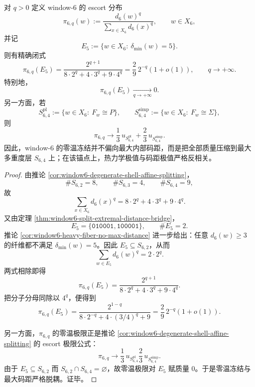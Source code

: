\begin{theorem}[零温冻结与几何极值的严格反相关]\label{thm:conclusion-window6-zero-temp-vs-codegap-anticorrelation}
对 \(q>0\) 定义 window-\(6\) 的 escort 分布
\[
\pi_{6,q}(w):=\frac{d_6(w)^q}{\sum_{x\in X_6}d_6(x)^q},
\qquad
w\in X_6,
\]
并记
\[
E_5:=\{w\in X_6:\ \delta_{\min}(w)=5\}.
\]
则有精确闭式
\[
\pi_{6,q}(E_5)
=
\frac{2^{q+1}}{8\cdot 2^q+4\cdot 3^q+9\cdot 4^q}
=
\frac{2}{9}\,2^{-q}(1+o(1)),
\qquad q\to+\infty.
\]
特别地，
\[
\pi_{6,q}(E_5)\xrightarrow[q\to+\infty]{}0.
\]
另一方面，若
\[
S_{6,4}^{\mathrm{pl}}:=\{w\in X_6:\ F_w\cong P\},
\qquad
S_{6,4}^{\mathrm{simp}}:=\{w\in X_6:\ F_w\cong \Sigma\},
\]
则
\[
\pi_{6,q}\longrightarrow
\frac13\,u_{S_{6,4}^{\mathrm{pl}}}
+\frac23\,u_{S_{6,4}^{\mathrm{simp}}}.
\]
因此，window-\(6\) 的零温冻结并不偏向最大内部码距，而是把全部质量压缩到最大多重度层 \(S_{6,4}\) 上；在该锚点上，热力学极值与码距极值严格反相关。
\end{theorem}
\begin{proof}
由推论 \ref{cor:window6-degenerate-shell-affine-splitting}，
\[
\#S_{6,2}=8,\qquad \#S_{6,3}=4,\qquad \#S_{6,4}=9,
\]
故
\[
\sum_{x\in X_6}d_6(x)^q=8\cdot 2^q+4\cdot 3^q+9\cdot 4^q.
\]
又由定理 \ref{thm:window6-split-extremal-distance-bridge}，
\[
E_5=\{\texttt{010001},\texttt{100001}\},
\qquad
\#E_5=2.
\]
推论 \ref{cor:window6-heavy-fiber-no-max-distance} 进一步给出：任意 \(d_6(w)\ge 3\) 的纤维都不满足 \(\delta_{\min}(w)=5\)。因此 \(E_5\subseteq S_{6,2}\)，从而
\[
\sum_{w\in E_5}d_6(w)^q=2\cdot 2^q.
\]
两式相除即得
\[
\pi_{6,q}(E_5)=\frac{2^{q+1}}{8\cdot 2^q+4\cdot 3^q+9\cdot 4^q}.
\]
把分子分母同除以 \(4^q\)，便得到
\[
\pi_{6,q}(E_5)
=
\frac{2^{1-q}}{8\cdot 2^{-q}+4\cdot (3/4)^q+9}
=
\frac{2}{9}\,2^{-q}(1+o(1)).
\]

另一方面，\(\pi_{6,q}\) 的零温极限正是推论 \ref{cor:window6-degenerate-shell-affine-splitting} 的 escort 极限公式：
\[
\pi_{6,q}\longrightarrow
\frac13\,u_{S_{6,4}^{\mathrm{pl}}}
\frac23\,u_{S_{6,4}^{\mathrm{simp}}}.
\]
由于 \(E_5\subseteq S_{6,2}\) 而 \(S_{6,2}\cap S_{6,4}=\varnothing\)，故零温极限对 \(E_5\) 赋质量 \(0\)。于是零温冻结与最大码距严格脱耦。证毕。
\end{proof}

